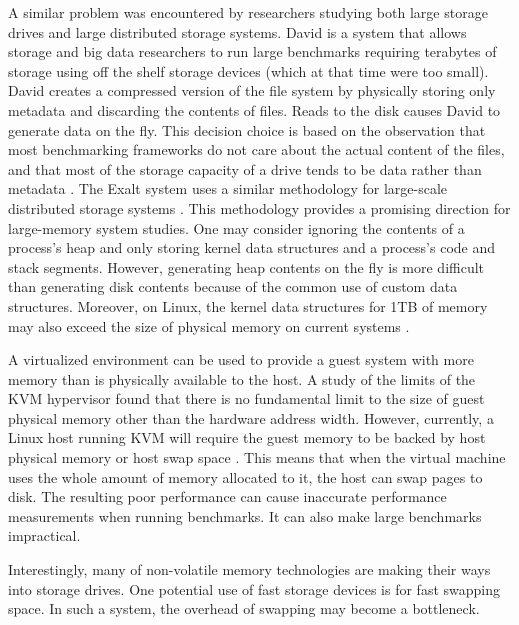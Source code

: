 \documentclass[twocolumn,11pt]{article}
\begin{document}
A similar problem was encountered by researchers studying both large storage
drives and large distributed storage systems. David is a system that allows
storage and big data researchers to run large benchmarks requiring terabytes of
storage using off the shelf storage devices (which at that time were too small).
David creates a compressed version of the file system by physically storing only
metadata and discarding the contents of files. Reads to the disk causes David to
generate data on the fly. This decision choice is based on the observation that
most benchmarking frameworks do not care about the actual content of the files,
and that most of the storage capacity of a drive tends to be data rather than
metadata \cite{david}. The Exalt system uses a similar methodology for
large-scale distributed storage systems \cite{exalt}. This methodology provides
a promising direction for large-memory system studies. One may consider ignoring
the contents of a process’s heap and only storing kernel data structures and a
process’s code and stack segments. However, generating heap contents on the fly
is more difficult than generating disk contents because of the common use of
custom data structures. Moreover, on Linux, the kernel data structures for 1TB
of memory may also exceed the size of physical memory on current systems
\cite{simics}.

A virtualized environment can be used to provide a guest system with more memory
than is physically available to the host. A study of the limits of the KVM
hypervisor found that there is no fundamental limit to the size of guest
physical memory other than the hardware address width. However, currently, a
Linux host running KVM will require the guest memory to be backed by host
physical memory or host swap space \cite{ibmkvm}.  This means that when the
virtual machine uses the whole amount of memory allocated to it, the host can
swap pages to disk. The resulting poor performance can cause inaccurate
performance measurements when running benchmarks. It can also make large
benchmarks impractical.

Interestingly, many of non-volatile memory technologies are making their ways
into storage drives. One potential use of fast storage devices is for fast
swapping space. In such a system, the overhead of swapping may become a
bottleneck.
\end{document}
